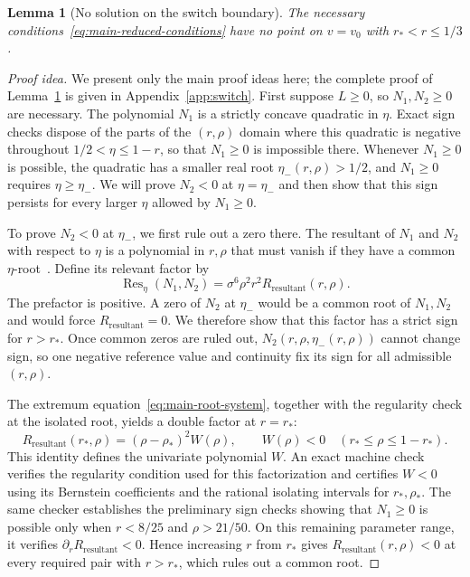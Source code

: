 \documentclass[11pt]{article}
\newtheorem{lemma}[theorem]{Lemma}
\theoremstyle{remark}
\theoremstyle{plain}
\begin{document}
\begin{lemma}[No solution on the switch boundary]
\label{lem:switch-exclusion}
The necessary conditions~\eqref{eq:main-reduced-conditions}
have no point on $v=v_0$ with $r_*<r\le1/3$.
\end{lemma}
\begin{proof}[Proof idea]
We present only the main proof ideas here; the complete proof of
Lemma~\ref{lem:switch-exclusion} is given in Appendix~\ref{app:switch}.
First suppose $L\ge0$, so $N_1,N_2\ge0$ are necessary.
The polynomial $N_1$ is a strictly concave quadratic in $\eta$.
Exact sign checks dispose of the parts of the $(r,\rho)$ domain
where this quadratic is negative throughout $1/2<\eta\le1-r$, so
that $N_1\ge0$ is impossible there.
Whenever $N_1\ge0$ is possible, the quadratic has a smaller real
root $\eta_-(r,\rho)>1/2$, and $N_1\ge0$ requires $\eta\ge\eta_-$.
We will prove $N_2<0$ at $\eta=\eta_-$ and then show that this sign
persists for every larger $\eta$ allowed by $N_1\ge0$.

To prove $N_2<0$ at $\eta_-$, we first rule out a zero there.
The resultant of $N_1$ and $N_2$ with respect to $\eta$ is a
polynomial in $r,\rho$ that must vanish if they have a common
$\eta$-root~\cite{cox2015}. Define its relevant factor by
\begin{equation}
 \operatorname{Res}_\eta(N_1,N_2)
   =\sigma^6\rho^2r^2R_{\mathrm{resultant}}(r,\rho).
 \label{eq:main-switch-resultant}
\end{equation}
The prefactor is positive. A zero of $N_2$ at $\eta_-$ would be a
common root of $N_1,N_2$ and would force
$R_{\mathrm{resultant}}=0$. We therefore show that this factor has a
strict sign for $r>r_*$. Once common zeros are ruled out,
$N_2(r,\rho,\eta_-(r,\rho))$ cannot change sign, so one negative
reference value and continuity fix its sign for all admissible
$(r,\rho)$.

The extremum equation~\eqref{eq:main-root-system}, together with
the regularity check at the isolated root, yields a double factor
at $r=r_*$:
\begin{equation}
 R_{\mathrm{resultant}}(r_*,\rho)=(\rho-\rho_*)^2W(\rho),
 \qquad W(\rho)<0\quad(r_*\le\rho\le1-r_*).
 \label{eq:main-resultant-at-root}
\end{equation}
This identity defines the univariate polynomial $W$.
An exact machine check verifies the regularity condition used for
this factorization and certifies $W<0$ using its Bernstein coefficients
and the rational isolating intervals for $r_*,\rho_*$.
The same checker establishes the preliminary sign checks showing
that $N_1\ge0$ is possible only when $r<8/25$
and $\rho>21/50$. On this remaining parameter range, it verifies
$\partial_rR_{\mathrm{resultant}}<0$.
Hence increasing $r$ from $r_*$ gives
$R_{\mathrm{resultant}}(r,\rho)<0$ at every required pair with
$r>r_*$, which rules out a common root.


\end{proof}
\end{document}
